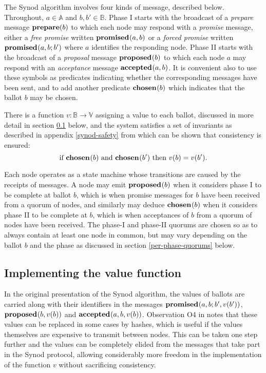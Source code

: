 \documentclass[journal]{IEEEtran}
\begin{document}
The Synod algorithm involves four kinds of message, described below.
Throughout, $a \in \mathbb A$ and $b, b' \in \mathbb B$.  Phase I starts with
the broadcast of a \textit{prepare} message $\mathbf{prepare}(b)$ to which each node may
respond with a \textit{promise} message, either a \textit{free promise} written
$\mathbf{promised}_{}(a,b)$ or a \textit{forced promise} written $\mathbf{promised}_{}(a,b;b')$
where $a$ identifies the responding node.  Phase II starts with the broadcast
of a \textit{proposal} message $\mathbf{proposed}_{}(b)$ to which each node $a$ may respond
with an \textit{acceptance} message $\mathbf{accepted}_{}(a,b)$.  It is convenient also to
use these symbols as predicates indicating whether the corresponding messages
have been sent, and to add another predicate $\mathbf{chosen}_{}(b)$ which indicates
that the ballot $b$ may be chosen.

There is a function $v : \mathbb B \to \mathbb V$ assigning a value to each
ballot, discussed in more detail in section \ref{value-function} below, and
the system satisfies a set of invariants as described in appendix
\ref{synod-safety} from which can be shown that consistency is ensured:
\[\textrm{if } \mathbf{chosen}_{}(b) \textrm{ and } \mathbf{chosen}_{}(b') \textrm { then } v(b)
= v(b').\]

Each node operates as a state machine whose transitions are caused by the
receipts of messages. A node may emit $\mathbf{proposed}_{}(b)$ when it considers phase I to
be complete at ballot $b$, which is when promise messages for $b$ have been
received from a quorum of nodes, and similarly may deduce $\mathbf{chosen}_{}(b)$ when
it considers phase II to be complete at $b$, which is when acceptances of $b$
from a quorum of nodes have been received. The phase-I and phase-II quorums are
chosen so as to always contain at least one node in common, but may vary
depending on the ballot $b$ and the phase as discussed in section
\ref{per-phase-quorums} below.

\subsection{Implementing the value function}\label{value-function}

In the original presentation of the Synod algorithm, the values of ballots
are carried along with their identifiers in the messages $\mathbf{promised}_{}(a,b;
b',v(b') )$, $\mathbf{proposed}_{}( b,v(b))$ and $\mathbf{accepted}_{}(a, b,v(b) )$. Observation O4 in
\cite{cheap-paxos} notes that these values can be replaced in some cases by
hashes, which is useful if the values themselves are expensive to transmit
between nodes. This can be taken one step further and the values can be
completely elided from the messages that take part in the Synod protocol,
allowing considerably more freedom in the implementation of the function $v$
without sacrificing consistency.
\end{document}

